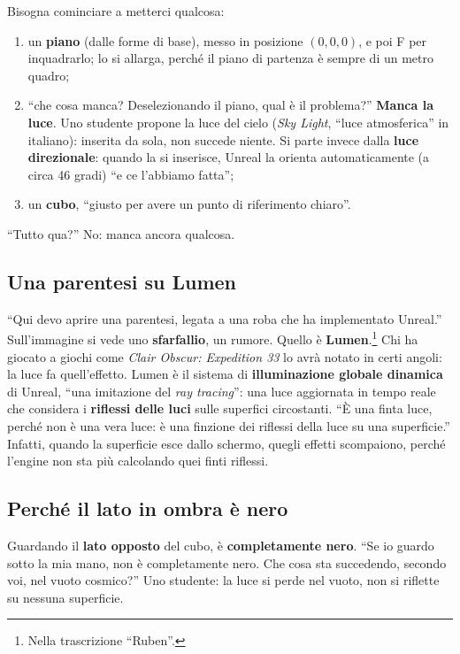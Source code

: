 Bisogna cominciare a metterci qualcosa:
\begin{enumerate}
  \item un \textbf{piano} (dalle forme di base), messo in posizione
        $(0,0,0)$, e poi F per inquadrarlo; lo si allarga, perché il piano di
        partenza è sempre di un metro quadro;
  \item ``che cosa manca? Deselezionando il piano, qual è il problema?''
        \textbf{Manca la luce}. Uno studente propone la luce del cielo
        (\emph{Sky Light}, ``luce atmosferica'' in italiano): inserita da sola,
        non succede niente. Si parte invece dalla \textbf{luce direzionale}:
        quando la si inserisce, Unreal la orienta automaticamente (a circa 46
        gradi) ``e ce l'abbiamo fatta'';
  \item un \textbf{cubo}, ``giusto per avere un punto di riferimento chiaro''.
\end{enumerate}
``Tutto qua?'' No: manca ancora qualcosa.

\subsection{Una parentesi su Lumen}

``Qui devo aprire una parentesi, legata a una roba che ha implementato Unreal.''
Sull'immagine si vede uno \textbf{sfarfallio}, un rumore. Quello è
\textbf{Lumen}.\footnote{Nella trascrizione ``Ruben''.} Chi ha giocato a giochi
come \emph{Clair Obscur: Expedition 33} lo avrà notato in certi angoli: la luce
fa quell'effetto. Lumen è il sistema di \textbf{illuminazione globale dinamica}
di Unreal, ``una imitazione del \emph{ray tracing}'': una luce aggiornata in
tempo reale che considera i \textbf{riflessi delle luci} sulle superfici
circostanti. ``È una finta luce, perché non è una vera luce: è una finzione dei
riflessi della luce su una superficie.'' Infatti, quando la superficie esce
dallo schermo, quegli effetti scompaiono, perché l'engine non sta più calcolando
quei finti riflessi.

\subsection{Perché il lato in ombra è nero}

Guardando il \textbf{lato opposto} del cubo, è \textbf{completamente nero}.
``Se io guardo sotto la mia mano, non è completamente nero. Che cosa sta
succedendo, secondo voi, nel vuoto cosmico?'' Uno studente: la luce si perde nel
vuoto, non si riflette su nessuna superficie.

